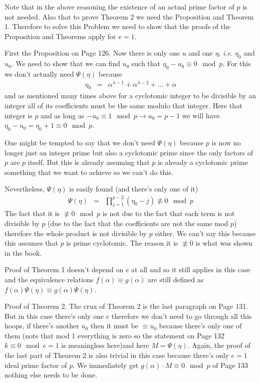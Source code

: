 \documentclass[aps,preprint,preprintnumbers,nofootinbib,showpacs,prd]{revtex4-1}
\newcommand{\ie}{{\it i.e.} }
\newcommand{\nbea}{\begin{eqnarray*}}
\newcommand{\neea}{\end{eqnarray*}}
\begin{document}
Note that in the above reasoning the existence of an actual prime factor of $p$ is not needed. Also that to prove Theorem 2 we need the Proposition and Theorem 1. Therefore to solve this Problem we need to show that the proofs of the Proposition and Theorems apply for $e = 1$.

First the Proposition on Page 126. Now there is only one $u$ and one $\eta$, \ie $\eta_0$ and $u_0$. We need to show that we can find $u_0$ such that $\eta_0 - u_0 \equiv 0 \mod{p}$. For this we don't actually need $\Psi(\eta)$ because
%
\nbea
\eta_0 & = & \alpha^{\lambda - 1} + \alpha^{\lambda - 2} + \dots + \alpha
\neea
%
and as mentioned many times above for a cyclotomic integer to be divisible by an integer all of its coefficients must be the same modulo that integer. Here that integer is $p$ and as long as $-u_0 \equiv 1 \mod{p} \to u_0 = p - 1$ we will have $\eta_0 - u_0 = \eta_0 + 1 \equiv 0 \mod{p}$.

One might be tempted to say that we don't need $\Psi(\eta)$ because $p$ is now no longer just an integer prime but also a cyclotomic prime since the only factors of $p$ are $p$ itself. But this is already assuming that $p$ is already a cyclotomic prime something that we want to achieve so we can't do this.

Nevertheless, $\Psi(\eta)$ is easily found (and there's only one of it)
%
\nbea
\Psi(\eta) & = & \prod_{j = 1}^{p - 2} (\eta_0 - j) \not\equiv 0 \mod{p}
\neea
%
The fact that it is $\not\equiv 0 \mod{p}$ is not due to the fact that each term is not divisible by $p$ (due to the fact that the coefficients are not the same mod $p$) therefore the whole product is not divisible by $p$ either. We can't say this because this assumes that $p$ is prime cyclotomic. The reason it is $\not\equiv 0$ is what was shown in the book.

Proof of Theorem 1 doesn't depend on $e$ at all and so it still applies in this case and the equivalence relations $f(\alpha) \equiv g(\alpha)$ are still defined as $f(\alpha)\Psi(\eta) \equiv g(\alpha)\Psi(\eta)$.

Proof of Theorem 2. The crux of Theorem 2 is the last paragraph on Page 131. But in this case there's only one $e$ therefore we don't need to go through all this hoops, if there's another $\overline{u}_0$ then it must be $\equiv u_0$ because there's only one of them (note that mod 1 everything is zero so the statement on Page 132 $k \equiv 0 \mod{e=1}$ is meaningless here)and here $M = \Psi(\eta)$. Again, the proof of the last part of Theorem 2 is also trivial in this case because there's only $e = 1$ ideal prime factor of $p$. We immediately get $g(\alpha)\cdot M \equiv 0 \mod{p}$ of Page 133 nothing else needs to be done.
\end{document}
